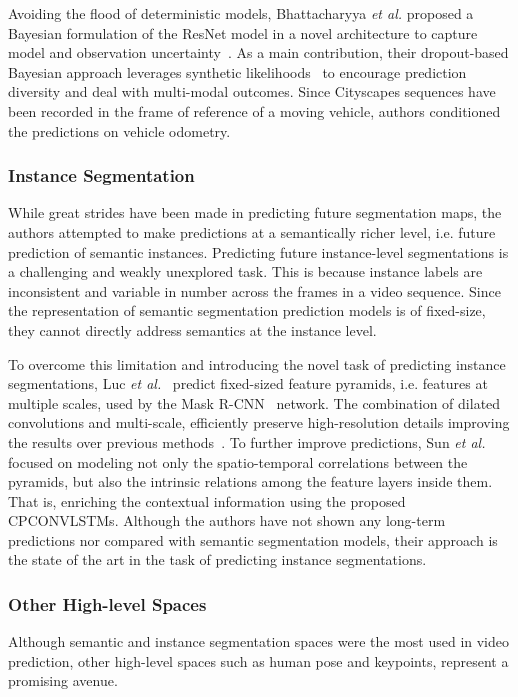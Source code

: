 Avoiding the flood of deterministic models, Bhattacharyya \textit{et al.} proposed a Bayesian formulation of the ResNet model in a novel architecture to capture model and observation uncertainty~\cite{Bhattacharyya2019}. As a main contribution, their dropout-based Bayesian approach leverages synthetic likelihoods~\cite{Rosca2017} to encourage prediction diversity and deal with multi-modal outcomes. Since Cityscapes sequences have been recorded in the frame of reference of a moving vehicle, authors conditioned the predictions on vehicle odometry. 

\subsubsection{Instance Segmentation}
While great strides have been made in predicting future segmentation maps, the authors attempted to make predictions at a semantically richer level, i.e. future prediction of semantic instances. Predicting future instance-level segmentations is a challenging and weakly unexplored task. This is because instance labels are inconsistent and variable in number across the frames in a video sequence. Since the representation of semantic segmentation prediction models is of fixed-size, they cannot directly address semantics at the instance level.

To overcome this limitation and introducing the novel task of predicting instance segmentations, Luc \textit{et al.}~\cite{Luc2018} predict fixed-sized feature pyramids, i.e. features at multiple scales, used by the Mask R-CNN~\cite{He2017} network. The combination of dilated convolutions and multi-scale, efficiently preserve high-resolution details improving the results over previous methods~\cite{Luc2017}. To further improve predictions, Sun \textit{et al.}~\cite{Sun2019} focused on modeling not only the spatio-temporal correlations between the pyramids, but also the intrinsic relations among the feature layers inside them. That is, enriching the contextual information using the proposed \acp{CPCONVLSTM}. Although the authors have not shown any long-term predictions nor compared with semantic segmentation models, their approach is the state of the art in the task of predicting instance segmentations.

\subsubsection{Other High-level Spaces}
Although semantic and instance segmentation spaces were the most used in video prediction, other high-level spaces such as human pose and keypoints, represent a promising avenue.

